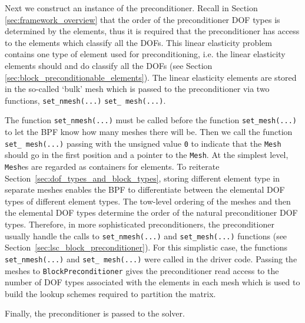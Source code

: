 Next we construct an instance of the preconditioner. Recall in Section
\ref{sec:framework_overview} that the order of the preconditioner DOF types is
determined by the elements, thus it is required that the preconditioner has
access to the elements which classify all the DOFs. This linear elasticity
problem contains one type of element used for preconditioning, i.e. the linear
elasticity elements should and do classify all the DOFs (see Section
\ref{sec:block_preconditionable_elements}). The linear elasticity elements are
stored in the so-called `bulk' mesh which is passed to the preconditioner via
two functions, \texttt{set\_\allowbreak nmesh(...)} \texttt{set\_\allowbreak
  mesh(...)}. 
\lstset{numberstyle=\scriptsize,breaklines=true, numbers=left, stepnumber=2, frame=single,basicstyle=\ttfamily\scriptsize, showstringspaces=false, language=C++}

The function \texttt{set\_\allowbreak nmesh(...)} must be called before the
function \texttt{set\_\allowbreak mesh(...)} to let the BPF know how many
meshes there will be. Then we call the function \texttt{set\_\allowbreak
  mesh(...)} passing with the unsigned value \texttt{0} to indicate that the
\texttt{Mesh} should go in the first position and a pointer to the
\texttt{Mesh}. At the simplest level, \texttt{Mesh}es are regarded as
containers for elements. To reiterate
Section~\ref{sec:dof_types_and_block_types}, storing different element type in
separate meshes enables the BPF to differentiate between the elemental DOF
types of different element types. The tow-level ordering of the meshes and then
the elemental DOF types determine the order of the natural preconditioner DOF
types.  Therefore, in more sophisticated preconditioners, the preconditioner
usually handle the calls to \texttt{set\_\allowbreak nmesh(...)} and
\texttt{set\_\allowbreak mesh(...)} functions (see
Section~\ref{sec:lsc_block_preconditioner}). For this simplistic case, the
functions \texttt{set\_\allowbreak nmesh(...)} and \texttt{set\_\allowbreak
  mesh(...)} were called in the driver code. Passing the meshes to
\texttt{Block\allowbreak Preconditioner} gives the preconditioner read access
to the number of DOF types associated with the elements in each mesh which is
used to build the lookup schemes required to partition the matrix.

Finally, the preconditioner is passed to the solver.



